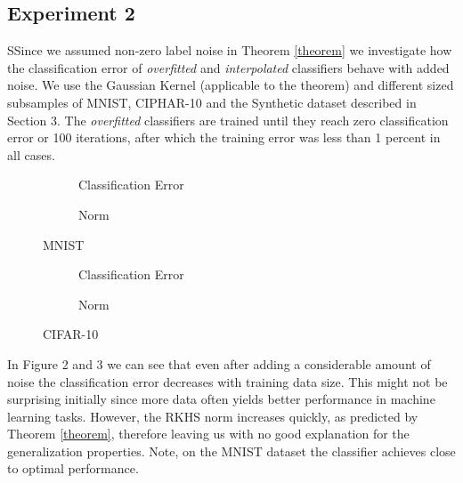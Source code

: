 
\subsection{Experiment 2}

SSince we assumed non-zero label noise in Theorem \ref{theorem} we investigate how the classification error of \textit{overfitted} and \textit{interpolated} classifiers behave with added noise. We use the Gaussian Kernel (applicable to the theorem) and different sized subsamples of MNIST, CIPHAR-10 and the Synthetic dataset described in Section 3. The \textit{overfitted} classifiers are trained until they reach zero classification error or 100 iterations, after which the training error was less than 1 percent in all cases.

\begin{figure}[p]

\begin{subfigure}{0.49\textwidth}
\caption{Classification Error} \label{fig:2a}
\end{subfigure}
\hspace*{\fill} %
\begin{subfigure}{0.49\textwidth}
\caption{Norm} \label{fig:2b}
\end{subfigure}
\caption{MNIST} \label{fig:2}

\begin{subfigure}{0.49\textwidth}
\caption{Classification Error} \label{fig:3a}
\end{subfigure}
\hspace*{\fill} %
\begin{subfigure}{0.49\textwidth}
\caption{Norm} \label{fig:3b}
\end{subfigure}
\caption{CIFAR-10} \label{fig:3}

\end{figure}


In Figure 2 and 3 we can see that even after adding a considerable amount of noise the classification error decreases with training data size. This might not be surprising initially since more data often yields better performance in machine learning tasks. However, the RKHS norm increases quickly, as predicted by Theorem \ref{theorem}, therefore leaving us with no good explanation for the generalization properties. Note, on the MNIST dataset the classifier achieves close to optimal performance.

